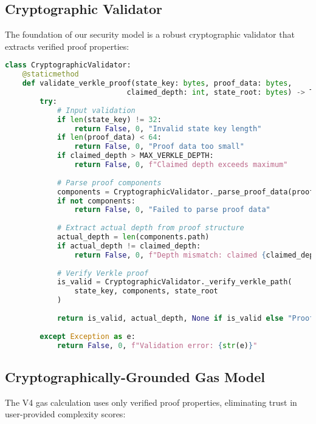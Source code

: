 \documentclass{article}
\begin{document}
\subsection{Cryptographic Validator}

The foundation of our security model is a robust cryptographic validator that extracts verified proof properties:

\begin{lstlisting}[language=Python,caption={Enhanced Verkle Proof Validator},label={lst:validator}]
class CryptographicValidator:
    @staticmethod
    def validate_verkle_proof(state_key: bytes, proof_data: bytes, 
                            claimed_depth: int, state_root: bytes) -> Tuple[bool, int, Optional[str]]:
        try:
            # Input validation
            if len(state_key) != 32:
                return False, 0, "Invalid state key length"
            if len(proof_data) < 64:
                return False, 0, "Proof data too small"
            if claimed_depth > MAX_VERKLE_DEPTH:
                return False, 0, f"Claimed depth exceeds maximum"
            
            # Parse proof components
            components = CryptographicValidator._parse_proof_data(proof_data)
            if not components:
                return False, 0, "Failed to parse proof data"
            
            # Extract actual depth from proof structure
            actual_depth = len(components.path)
            if actual_depth != claimed_depth:
                return False, 0, f"Depth mismatch: claimed {claimed_depth}, actual {actual_depth}"
            
            # Verify Verkle proof
            is_valid = CryptographicValidator._verify_verkle_path(
                state_key, components, state_root
            )
            
            return is_valid, actual_depth, None if is_valid else "Proof verification failed"
            
        except Exception as e:
            return False, 0, f"Validation error: {str(e)}"
\end{lstlisting}

\subsection{Cryptographically-Grounded Gas Model}

The V4 gas calculation uses only verified proof properties, eliminating trust in user-provided complexity scores:
\end{document}

